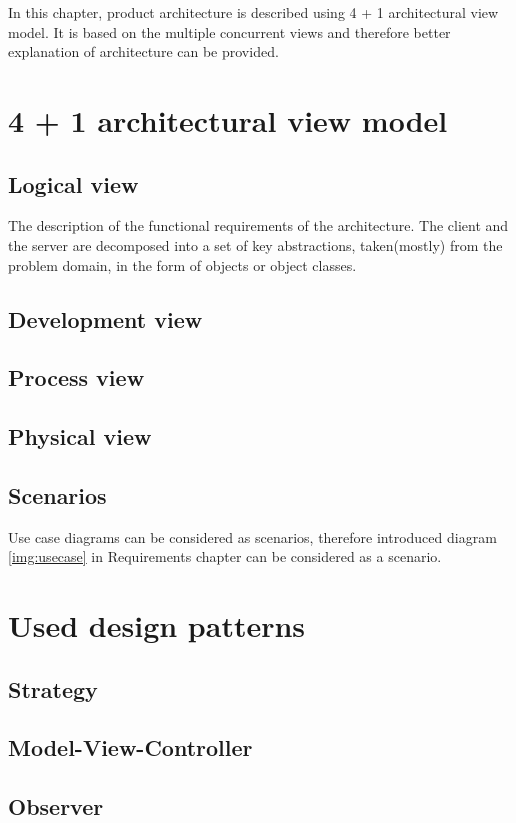 In this chapter, product architecture is described using 4 + 1 architectural view model.
It is based on the multiple concurrent views and therefore better explanation of architecture can be provided.

\section{4 + 1 architectural view model}
\subsection{Logical view}
The description of the functional requirements of the architecture. The client and the server are decomposed into a set of key abstractions, taken(mostly) from the problem domain, in the form of objects or object classes.

\subsection{Development view}
\subsection{Process view}
\subsection{Physical view}
\subsection{Scenarios}
Use case diagrams can be considered as scenarios, therefore introduced diagram \ref{img:usecase} in Requirements chapter can be considered as a scenario.

\section{Used design patterns}
\subsection{Strategy}
\subsection{Model-View-Controller}
\subsection{Observer}
